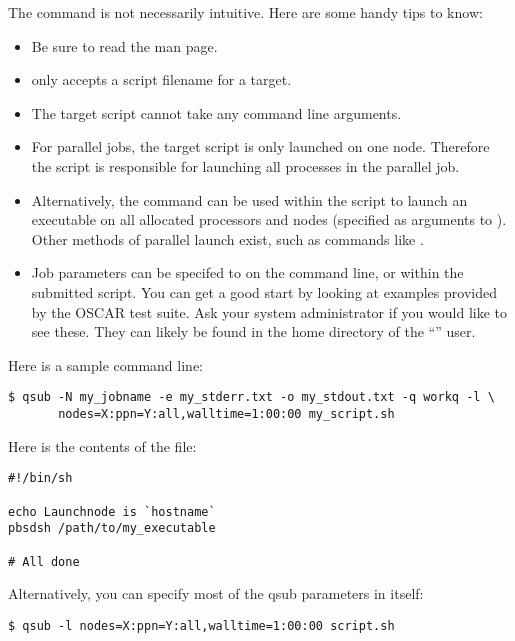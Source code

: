 The  command is not necessarily intuitive.  Here are some
handy tips to know:

\begin{itemize}
\item Be sure to read the  man page.

\item {} only accepts a script filename for a target.
  
\item The target script cannot take any command line arguments.
  
\item For parallel jobs, the target script is only launched on one
  node.  Therefore the script is responsible for launching all
  processes in the parallel job.
  
\item Alternatively, the  command can be used within the
  script to launch an executable on all allocated processors and nodes
  (specified as arguments to ).  Other methods of parallel
  launch exist, such as commands like .
  
\item Job parameters can be specifed to  on the command
  line, or within the submitted script.  You can get a good start by
  looking at examples provided by the OSCAR test suite.  Ask your
  system administrator if you would like to see these.  They can
  likely be found in the home directory of the ``''
  user.
\end{itemize}

Here is a sample  command line:

\begin{verbatim}
$ qsub -N my_jobname -e my_stderr.txt -o my_stdout.txt -q workq -l \
       nodes=X:ppn=Y:all,walltime=1:00:00 my_script.sh
\end{verbatim}

Here is the contents of the  file:

\begin{verbatim}
#!/bin/sh

echo Launchnode is `hostname`
pbsdsh /path/to/my_executable

# All done
\end{verbatim}

Alternatively, you can specify most of the qsub parameters in
 itself:

\begin{verbatim}
$ qsub -l nodes=X:ppn=Y:all,walltime=1:00:00 script.sh
\end{verbatim}

